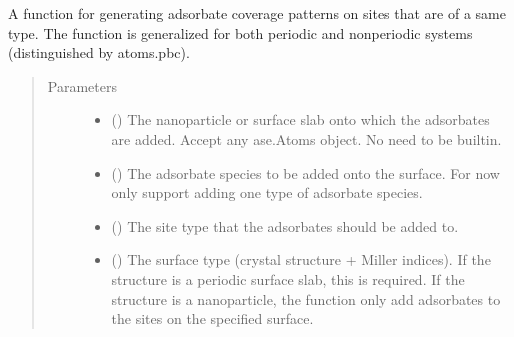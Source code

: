 \documentclass[letterpaper,10pt,english]{sphinxmanual}
\begin{document}
\begin{fulllineitems}
\label{\detokenize{build:acat.build.patterns.full_coverage_pattern}}
A function for generating adsorbate coverage patterns on sites
that are of a same type. The function is generalized for both
periodic and non\sphinxhyphen{}periodic systems (distinguished by atoms.pbc).
\begin{quote}\begin{description}
\item[{Parameters}] \leavevmode\begin{itemize}
\item {} 
 () \textendash{} The nanoparticle or surface slab onto which the adsorbates are
added. Accept any ase.Atoms object. No need to be built\sphinxhyphen{}in.

\item {} 
 () \textendash{} The adsorbate species to be added onto the surface.
For now only support adding one type of adsorbate species.

\item {} 
 () \textendash{} The site type that the adsorbates should be added to.

\item {} 
 (\sphinxstyleliteralemphasis{\sphinxupquote{, }}) \textendash{} The surface type (crystal structure + Miller indices).
If the structure is a periodic surface slab, this is required.
If the structure is a nanoparticle, the function only add
adsorbates to the sites on the specified surface.


\end{itemize}
\end{description}
\end{quote}
\end{fulllineitems}
\end{document}
